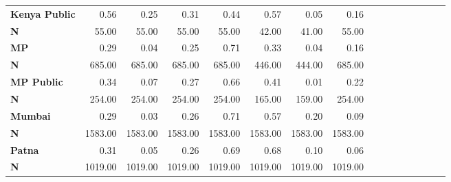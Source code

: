 \begin{tabular}{@{\extracolsep{5pt}}lrrrrrrrrrrrrrrr}
{\bf Kenya Public} & 0.56\phantom{***} & 0.25\phantom{***} & 0.31\phantom{***} & 0.44\phantom{***} & 0.57\phantom{***} & 0.05\phantom{***} & 0.16\phantom{***} \\
{\bf N} & 55.00\phantom{***} & 55.00\phantom{***} & 55.00\phantom{***} & 55.00\phantom{***} & 42.00\phantom{***} & 41.00\phantom{***} & 55.00\phantom{***} \\
{\bf MP} & 0.29\phantom{***} & 0.04\phantom{***} & 0.25\phantom{***} & 0.71\phantom{***} & 0.33\phantom{***} & 0.04\phantom{***} & 0.16\phantom{***} \\
{\bf N} & 685.00\phantom{***} & 685.00\phantom{***} & 685.00\phantom{***} & 685.00\phantom{***} & 446.00\phantom{***} & 444.00\phantom{***} & 685.00\phantom{***} \\
{\bf MP Public} & 0.34\phantom{***} & 0.07\phantom{***} & 0.27\phantom{***} & 0.66\phantom{***} & 0.41\phantom{***} & 0.01\phantom{***} & 0.22\phantom{***} \\
{\bf N} & 254.00\phantom{***} & 254.00\phantom{***} & 254.00\phantom{***} & 254.00\phantom{***} & 165.00\phantom{***} & 159.00\phantom{***} & 254.00\phantom{***} \\
{\bf Mumbai} & 0.29\phantom{***} & 0.03\phantom{***} & 0.26\phantom{***} & 0.71\phantom{***} & 0.57\phantom{***} & 0.20\phantom{***} & 0.09\phantom{***} \\
{\bf N} & 1583.00\phantom{***} & 1583.00\phantom{***} & 1583.00\phantom{***} & 1583.00\phantom{***} & 1583.00\phantom{***} & 1583.00\phantom{***} & 1583.00\phantom{***} \\
{\bf Patna} & 0.31\phantom{***} & 0.05\phantom{***} & 0.26\phantom{***} & 0.69\phantom{***} & 0.68\phantom{***} & 0.10\phantom{***} & 0.06\phantom{***} \\
{\bf N} & 1019.00\phantom{***} & 1019.00\phantom{***} & 1019.00\phantom{***} & 1019.00\phantom{***} & 1019.00\phantom{***} & 1019.00\phantom{***} & 1019.00\phantom{***} \\
\hline
\end{tabular}
